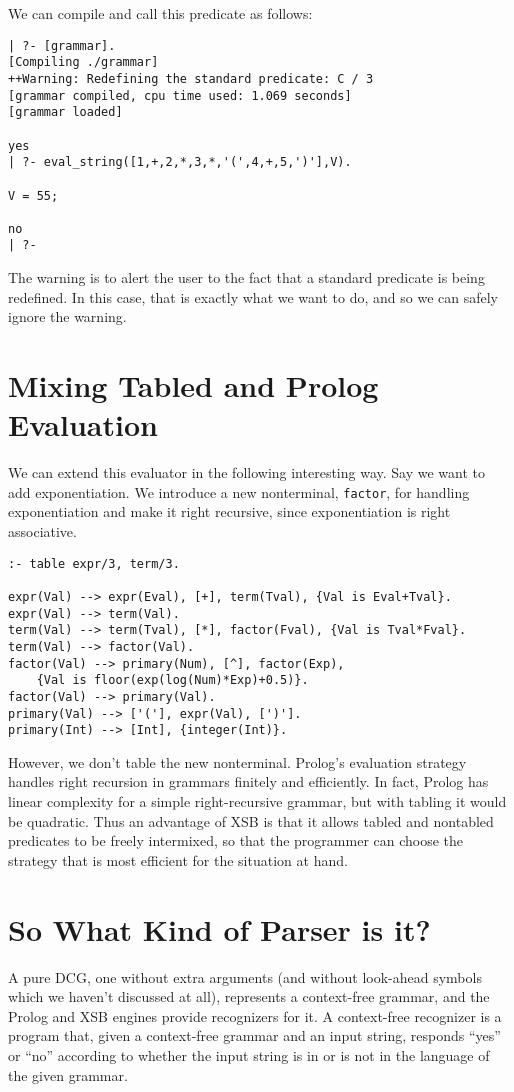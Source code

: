 We can compile and call this predicate as follows:
\begin{verbatim}
| ?- [grammar].
[Compiling ./grammar]
++Warning: Redefining the standard predicate: C / 3
[grammar compiled, cpu time used: 1.069 seconds]
[grammar loaded]

yes
| ?- eval_string([1,+,2,*,3,*,'(',4,+,5,')'],V).

V = 55;

no
| ?- 
\end{verbatim}
The warning is to alert the user to the fact that a standard predicate
is being redefined.  In this case, that is exactly what we want to do,
and so we can safely ignore the warning.

\section{Mixing Tabled and Prolog Evaluation}

We can extend this evaluator in the following interesting way.  Say we
want to add exponentiation.  We introduce a new nonterminal,
\verb|factor|, for handling exponentiation and make it right
recursive, since exponentiation is right associative.  
\begin{verbatim}
:- table expr/3, term/3.

expr(Val) --> expr(Eval), [+], term(Tval), {Val is Eval+Tval}.
expr(Val) --> term(Val).
term(Val) --> term(Tval), [*], factor(Fval), {Val is Tval*Fval}.
term(Val) --> factor(Val).
factor(Val) --> primary(Num), [^], factor(Exp), 
    {Val is floor(exp(log(Num)*Exp)+0.5)}.
factor(Val) --> primary(Val).
primary(Val) --> ['('], expr(Val), [')'].
primary(Int) --> [Int], {integer(Int)}.
\end{verbatim}
However, we don't table the new nonterminal.  Prolog's evaluation
strategy handles right recursion in grammars finitely and efficiently.
In fact, Prolog has linear complexity for a simple right-recursive
grammar, but with tabling it would be quadratic.  Thus an advantage of
XSB is that it allows tabled and nontabled predicates to be freely
intermixed, so that the programmer can choose the strategy that is
most efficient for the situation at hand.

\section{So What Kind of Parser is it?}

A pure DCG, one without extra arguments (and without look-ahead
symbols which we haven't discussed at all), represents a context-free
grammar, and the Prolog and XSB engines provide recognizers for it.  A
context-free recognizer is a program that, given a context-free
grammar and an input string, responds ``yes'' or ``no'' according to
whether the input string is in or is not in the language of the given
grammar.

